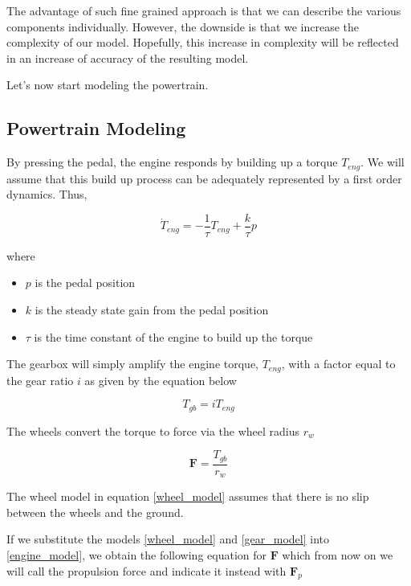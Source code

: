 The advantage of such fine grained approach is that we can describe the various components individually. However, the downside is that we increase
the complexity of our model. Hopefully, this increase in complexity will be reflected in an increase of  accuracy of the resulting model.

Let's now start modeling the powertrain. 

\subsection{Powertrain Modeling}

By pressing the pedal, the engine responds by building up a torque $T_{eng}$. We will assume that this build up process can be adequately represented by a first
order dynamics. Thus,

\begin{equation}
\dot{T}_{eng } = - \frac{1}{\tau}T_{eng} + \frac{k}{\tau} p 
\label{engine_model}
\end{equation}

where

\begin{itemize}
\item $p$ is the pedal position
\item $k$ is the steady state gain from the pedal position
\item $\tau$ is the time constant of the engine to build up the torque
\end{itemize}


The gearbox will simply amplify the engine torque, $T_{eng}$,  with a factor equal to the gear ratio $i$ as given by the equation below

\begin{equation}
T_{gb } = iT_{eng} 
\label{gear_model} 
\end{equation}



The wheels convert the torque to force via the wheel radius $r_w$ 

\begin{equation}
\mathbf{F} = \frac{T_{gb}}{r_w}  
\label{wheel_model}
\end{equation}

The wheel model in equation \ref{wheel_model} assumes that there is no slip between the wheels and the ground. 

If we substitute the models \ref{wheel_model} and \ref{gear_model} into \ref{engine_model}, we obtain the following equation for $\mathbf{F}$ which from now on we will call the propulsion force and indicate it instead with $\mathbf{F}_p$


